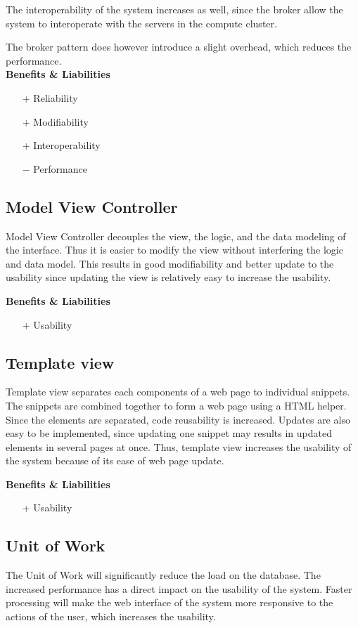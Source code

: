 The interoperability of the system increases as well, since the broker allow the system to interoperate with the servers in the compute cluster.

The broker pattern does however introduce a slight overhead, which reduces the performance.\\
\textbf{Benefits \& Liabilities} ~
\begin{itemize}
\item[+] Reliability
\item[+] Modifiability
\item[+] Interoperability
\item[$-$] Performance
\end{itemize}

\subsection*{Model View Controller}
Model View Controller decouples the view, the logic, and the data modeling of the interface. Thus it is easier to modify the view without interfering the logic and data model. This results in good modifiability and better update to the usability since updating the view is relatively easy to increase the usability.

\textbf{Benefits \& Liabilities} ~
\begin{itemize} 
\item[+] Usability
\end{itemize}

\subsection*{Template view}
Template view separates each components of a web page to individual snippets. The snippets are combined together to form a web page using a HTML helper. Since the elements are separated, code reusability is increased. Updates are also easy to be implemented, since updating one snippet may results in updated elements in several pages at once. Thus, template view increases the usability of the system because of its ease of web page update.

\textbf{Benefits \& Liabilities} ~
\begin{itemize} 
\item[+] Usability
\end{itemize}

\subsection*{Unit of Work}
The Unit of Work will significantly reduce the load on the database. The increased performance has a direct impact on the usability of the system. Faster processing will make the web interface of the system more responsive to the actions of the user, which increases the usability.

